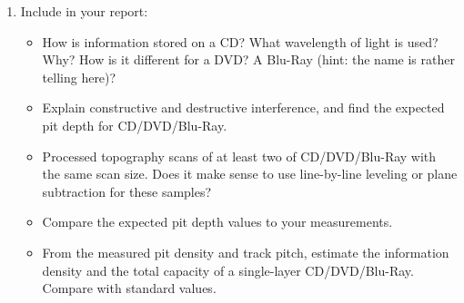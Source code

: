\documentclass{../lab}
\begin{document}
\begin{enumerate}
    \item Include in your report: 
    \begin{itemize}
        \item How is information stored on a CD? What wavelength of light is used? Why? How is it different for a DVD? A Blu-Ray (hint: the name is rather telling here)?
        \item Explain constructive and destructive interference, and find the expected pit depth for CD/DVD/Blu-Ray. 
        \item Processed topography scans of at least two of CD/DVD/Blu-Ray with the same scan size. Does it make sense to use line-by-line leveling or plane subtraction for these samples?
        \item Compare the expected pit depth values to your measurements.
        \item From the measured pit density and track pitch, estimate the information density and the total capacity of a single-layer CD/DVD/Blu-Ray. Compare with standard values.
    \end{itemize}

\end{enumerate}





\end{document}
